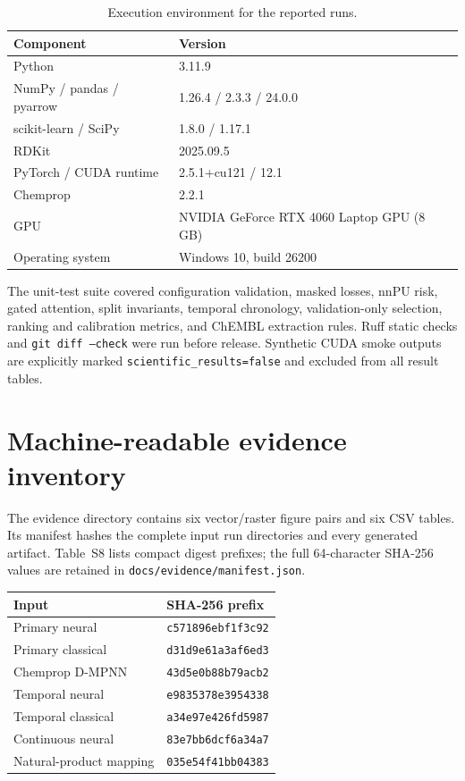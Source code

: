 \documentclass[11pt]{article}
\begin{document}
\begin{table}[ht]
\centering
\caption{Execution environment for the reported runs.}
\begin{tabular}{ll}
\toprule
Component & Version\\
\midrule
Python & 3.11.9\\
NumPy / pandas / pyarrow & 1.26.4 / 2.3.3 / 24.0.0\\
scikit-learn / SciPy & 1.8.0 / 1.17.1\\
RDKit & 2025.09.5\\
PyTorch / CUDA runtime & 2.5.1+cu121 / 12.1\\
Chemprop & 2.2.1\\
GPU & NVIDIA GeForce RTX 4060 Laptop GPU (8 GB)\\
Operating system & Windows 10, build 26200\\
\bottomrule
\end{tabular}
\end{table}

The unit-test suite covered configuration validation, masked losses, nnPU
risk, gated attention, split invariants, temporal chronology, validation-only
selection, ranking and calibration metrics, and ChEMBL extraction rules. Ruff
static checks and \texttt{git diff --check} were run before release. Synthetic
CUDA smoke outputs are explicitly marked
\texttt{scientific\_results=false} and excluded from all result tables.

\section{Machine-readable evidence inventory}

The evidence directory contains six vector/raster figure pairs and six CSV
tables. Its manifest hashes the complete input run directories and every
generated artifact. Table~S8 lists compact digest prefixes; the full 64-character
SHA-256 values are retained in \texttt{docs/evidence/manifest.json}.

\begin{longtable}{>{\raggedright\arraybackslash}p{}p{}}
\toprule
Input & SHA-256 prefix\\
\midrule
Primary neural & \texttt{c571896ebf1f3c92}\\
Primary classical & \texttt{d31d9e61a3af6ed3}\\
Chemprop D-MPNN & \texttt{43d5e0b88b79acb2}\\
Temporal neural & \texttt{e9835378e3954338}\\
Temporal classical & \texttt{a34e97e426fd5987}\\
Continuous neural & \texttt{83e7bb6dcf6a34a7}\\
Natural-product mapping & \texttt{035e54f41bb04383}\\
\bottomrule
\end{longtable}
\end{document}
